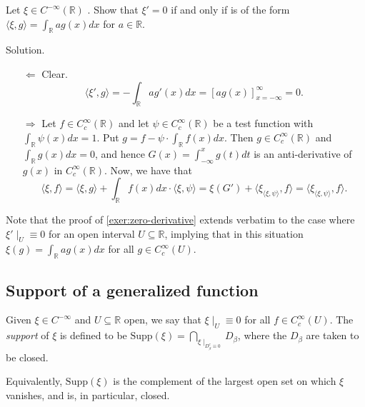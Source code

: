 \documentclass[12pt, draft,reqno,a4paper, twoside]{amsproc}
\newcommand{\supp}{\mathrm{Supp}}
\newcommand{\dbR}{\mathbb R}
\newcommand{\gen}[1]{\langle{#1}\rangle}
\newenvironment{sol}{\sc Solution. \rm}{\hfill \qedsymbol\bigskip}
\begin{document}
\begin{exer}\label{exer:zero-derivative} Let $\xi\in C^{-\infty}(\dbR)$ . Show that $\xi'=0$ if and only if is of the form $\gen{\xi,g}=\int_\dbR ag(x)dx$ for $a\in \dbR$. 
\end{exer}
\begin{sol}
\begin{itemize}
\item[$\Leftarrow$] Clear.
\[\gen{\xi',g}=-\int_\dbR ag'(x)dx=\left[ag(x)\right]_{x=-\infty}^\infty=0.\]
\item[$\Rightarrow$]
Let $f\in C_c^\infty(\dbR)$ and let $\psi\in C_c^\infty(\dbR)$ be a test function with $\int_\dbR\psi(x)dx=1$. Put $g=f-\psi\cdot\int_{\dbR}f(x)dx$. Then $g\in C_c^\infty(\dbR)$ and $\int_{\dbR}g(x)dx=0$, and hence $G(x)=\int_{-\infty}^x g(t)dt$ is an anti-derivative of $g(x)$ in $C_c^\infty(\dbR)$. Now, we have that
\[\gen{\xi,f}=\gen{\xi,g}+\int_{\dbR}f(x)dx\cdot \gen{\xi,\psi}=\xi(G')+\gen{\xi_{\gen{\xi,\psi}},f}=\gen{\xi_{\gen{\xi,\psi}},f}.\]

%
\end{itemize}
\end{sol}

\begin{rem}
Note that the proof of \autoref{exer:zero-derivative} extends verbatim to the case where $\xi'\mid_U\equiv0$ for an open interval $U\subseteq \dbR$, implying that in this situation $\xi(g)=\int_\dbR ag(x)dx$ for all $g\in C_c^\infty( U)$. 
\end{rem}

\subsection{Support of a generalized function}
\begin{defi} Given $\xi\in C^{-\infty}$ and $U\subseteq \dbR$ open, we say that $\xi\mid_U\equiv 0$ for all $f\in C_c^\infty(U)$. The \emph{support} of $\xi$ is defined to be $\supp(\xi)=\bigcap_{\xi\mid_{D_\beta^c\equiv 0}}D_\beta$, where the $D_\beta$ are taken to be closed. 
\end{defi}
Equivalently, $\supp (\xi)$ is the complement of the largest open set on which $\xi$ vanishes, and is, in particular, closed.
\end{document}
